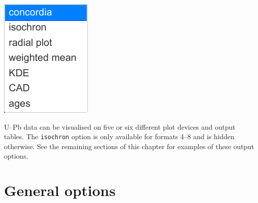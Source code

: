 \begin{refsection}
\noindent\begin{minipage}[t]{.15\linewidth}
\strut\vspace*{-\baselineskip}\newline
\includegraphics[width=\linewidth]{../figures/UPbPlotdevices.png}
\end{minipage}
\begin{minipage}[t]{.85\textwidth}
  U--Pb data can be visualised on five or six different plot devices
  and output tables. The \texttt{isochron} option is only available
  for formats 4--8 and is hidden otherwise. See the remaining sections
  of this chapter for examples of these output options.
\end{minipage}

\section{General options}
\label{sec:general}

\begin{enumerate}


\end{enumerate}
\end{refsection}
